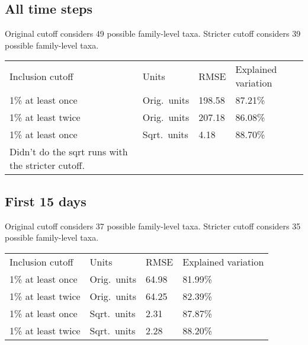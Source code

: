 \documentclass{article}
\begin{document}
\subsection{All time steps}

Original cutoff considers 49 possible family-level taxa.
Stricter cutoff considers 39 possible family-level taxa.

\begin{tabular}{llll}
Inclusion cutoff & Units  & RMSE & Explained variation\\
1\% at least once  & Orig.~units & 198.58 & 87.21\%\\
1\% at least twice & Orig.~units & 207.18 & 86.08\%\\
1\% at least once  & Sqrt.~units & 4.18 & 88.70\%\\
Didn't do the sqrt runs with the stricter cutoff.
\end{tabular}


\subsection{First 15 days}

Original cutoff considers 37 possible family-level taxa.
Stricter cutoff considers 35 possible family-level taxa.

\begin{tabular}{llll}
Inclusion cutoff & Units  & RMSE & Explained variation\\
1\% at least once  & Orig.~units & 64.98 & 81.99\%\\
1\% at least twice & Orig.~units & 64.25 & 82.39\%\\
1\% at least once  & Sqrt.~units & 2.31 & 87.87\%\\
1\% at least twice & Sqrt.~units & 2.28 & 88.20\%
\end{tabular}
\end{document}
